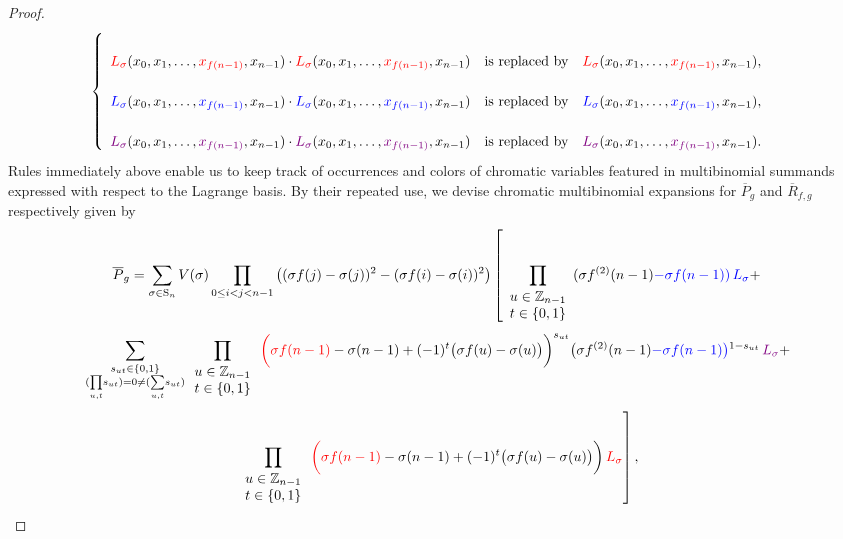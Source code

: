 \begin{proof}
\[\begin{cases}
\begin{array}{ccc}
\\
{\color{red}L_{\sigma}}(x_{0},x_{1},\ldots,{\color{red}x_{f(n-1)}},x_{n-1})\cdot{\color{red}L_{\sigma}}(x_{0},x_{1},\ldots,{\color{red}x_{f(n-1)}},x_{n-1}) & \text{is replaced by} & {\color{red}L_{\sigma}}(x_{0},x_{1},\ldots,{\color{red}x_{f(n-1)}},x_{n-1}),\\
\\
{\color{blue}L_{\sigma}}(x_{0},x_{1},\ldots,{\color{blue}x_{f(n-1)}},x_{n-1})\cdot{\color{blue}L_{\sigma}}(x_{0},x_{1},\ldots,{\color{blue}x_{f(n-1)}},x_{n-1}) & \text{is replaced by} & {\color{blue}L_{\sigma}}(x_{0},x_{1},\ldots,{\color{blue}x_{f(n-1)}},x_{n-1}),\\
\\
{\color{violet}L_{\sigma}}(x_{0},x_{1},\ldots,{\color{violet}x_{f(n-1)}},x_{n-1})\cdot{\color{violet}L_{\sigma}}(x_{0},x_{1},\ldots,{\color{violet}x_{f(n-1)}},x_{n-1}) & \text{is replaced by} & {\color{violet}L_{\sigma}}(x_{0},x_{1},\ldots,{\color{violet}x_{f(n-1)}},x_{n-1}).
\end{array}\end{cases}
\]
Rules immediately above enable us to keep track of occurrences and colors of chromatic variables featured in multibinomial summands expressed with respect to the Lagrange basis. By their repeated use, we devise chromatic multibinomial expansions for $\overline{P}_{g}$ and $\overline{R}_{f,g}$ respectively given by
\[
\overline{P}_{g}=\sum_{\sigma\in\text{S}_{n}}V(\sigma)\prod_{0\le i<j<n-1}\big((\sigma f(j)-\sigma(j))^{2}-(\sigma f(i)-\sigma(i))^{2}\big)\left[\prod_{\begin{array}{c}
u\in\mathbb{Z}_{n-1}\\
t\in\{0,1\}
\end{array}}(\sigma f^{(2)}(n-1){\color{blue}-\sigma f(n-1)}{\color{blue})}\,{\color{blue}L_{\sigma}}+\right.
\]
\[
\sum_{\substack{s_{ut}\in\{0,1\}\\
(\underset{u,t}{\prod}s_{ut})=0\ne(\underset{u,t}{\sum}s_{ut})
}
}\prod_{\begin{array}{c}
u\in\mathbb{Z}_{n-1}\\
t\in\{0,1\}
\end{array}}{\color{red}\bigg(\sigma f(n-1)}-\sigma(n-1)+(-1)^{t}\big(\sigma f(u)-\sigma(u)\big)\bigg)^{s_{ut}}\big(\sigma f^{(2)}(n-1){\color{blue}-\sigma f(n-1)}{\color{blue}\big)}^{1-s_{ut}}\,{\color{violet}L_{\sigma}}+
\]
\[
\left.\prod_{\begin{array}{c}
u\in\mathbb{Z}_{n-1}\\
t\in\{0,1\}
\end{array}}{\color{red}\bigg(\sigma f(n-1)}-\sigma(n-1)+(-1)^{t}\big(\sigma f(u)-\sigma(u)\big)\bigg)\,{\color{red}L_{\sigma}}\right],
\]
\end{proof}
